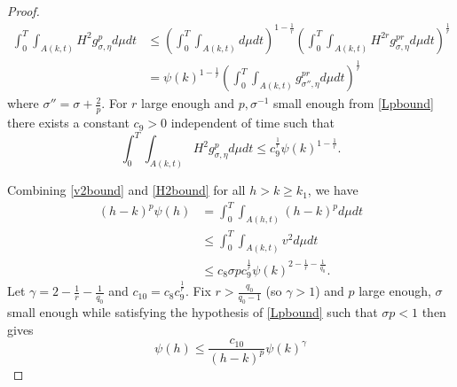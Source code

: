 \begin{proof}
\begin{align*}
            \int_{0}^{T}\int_{A(k,t)}H^{2}g_{\sigma,\eta}^{p}d \mu dt &\le \left( \int_{0}^{T}\int_{A(k,t)}d \mu dt \right)^{1-\frac{1}{r}}\left(\int_{0}^{T}\int_{A(k,t)}H^{2r}g_{\sigma,\eta}^{pr}d \mu dt\right)^{\frac{1}{r}} \\
            & = \psi(k)^{1-\frac{1}{r}} \left( \int_{0}^{T}\int_{A(k,t)}g_{\sigma'',\eta}^{pr}d \mu dt \right)^{\frac{1}{r}} %
        \end{align*}
        where $ \sigma'' = \sigma+ \frac{2}{p} $. %
        For $ r $ large enough and $ p,\sigma^{-1} $ small enough from \cref{Lpbound} there exists a constant $ c_{9}>0 $ independent of time such that 
        \begin{equation}\label{H2bound}
            \int_{0}^{T}\int_{A(k,t)}H^{2}g_{\sigma,\eta}^{p} d \mu dt \le c_{9}^{\frac{1}{r}} \psi(k)^{1-\frac{1}{r}}.
        \end{equation}
        
        Combining \cref{v2bound} and \cref{H2bound} for all $ h>k \ge k_{1} $, we have \begin{align*}
            (h-k)^{p}\psi(h) &=  \int_{0}^{T}\int_{A(h,t)}(h-k)^{p}d \mu dt  \\
            & \le \int_{0}^{T}\int_{A(k,t)}v^{2} d \mu dt \\
            & \le c_{8}\sigma p c_{9}^{\frac{1}{r}} \psi(k)^{2-\frac{1}{r}-\frac{1}{q_{0}}}.
        \end{align*}
        Let $ \gamma = 2-\frac{1}{r}-\frac{1}{q_{0}} $ and $ c_{10} =c_{8}c_{9}^{\frac{1}{r}} $. Fix $ r> \frac{q_{0}}{q_{0}-1} $ (so $ \gamma >1 $) and $ p $ large enough, $ \sigma  $ small enough while satisfying the hypothesis of \cref{Lpbound} such that $ \sigma p <1 $ then gives \begin{equation}
            \psi(h) \le \frac{c_{10}}{(h-k)^{p}}\psi(k)^{\gamma}
        \end{equation}


\end{proof}
